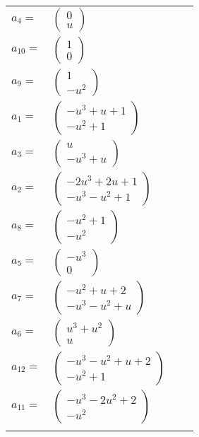 \documentclass[1p]{elsarticle_modified}
\theoremstyle{definition}
\begin{document}
\begin{tabular}{m{7pt} m{180pt} m{7pt} m{180pt} }
\flushright $a_{4}=$&$\begin{pmatrix}0\\u\end{pmatrix}$ \\
\flushright $a_{10}=$&$\begin{pmatrix}1\\0\end{pmatrix}$ \\
\flushright $a_{9}=$&$\begin{pmatrix}1\\- u^2\end{pmatrix}$ \\
\flushright $a_{1}=$&$\begin{pmatrix}- u^3+u+1\\- u^2+1\end{pmatrix}$ \\
\flushright $a_{3}=$&$\begin{pmatrix}u\\- u^3+u\end{pmatrix}$ \\
\flushright $a_{2}=$&$\begin{pmatrix}-2 u^3+2 u+1\\- u^3- u^2+1\end{pmatrix}$ \\
\flushright $a_{8}=$&$\begin{pmatrix}- u^2+1\\- u^2\end{pmatrix}$ \\
\flushright $a_{5}=$&$\begin{pmatrix}- u^3\\0\end{pmatrix}$ \\
\flushright $a_{7}=$&$\begin{pmatrix}- u^2+u+2\\- u^3- u^2+u\end{pmatrix}$ \\
\flushright $a_{6}=$&$\begin{pmatrix}u^3+u^2\\u\end{pmatrix}$ \\
\flushright $a_{12}=$&$\begin{pmatrix}- u^3- u^2+u+2\\- u^2+1\end{pmatrix}$ \\
\flushright $a_{11}=$&$\begin{pmatrix}- u^3-2 u^2+2\\- u^2\end{pmatrix}$\\&\end{tabular}
\end{document}
